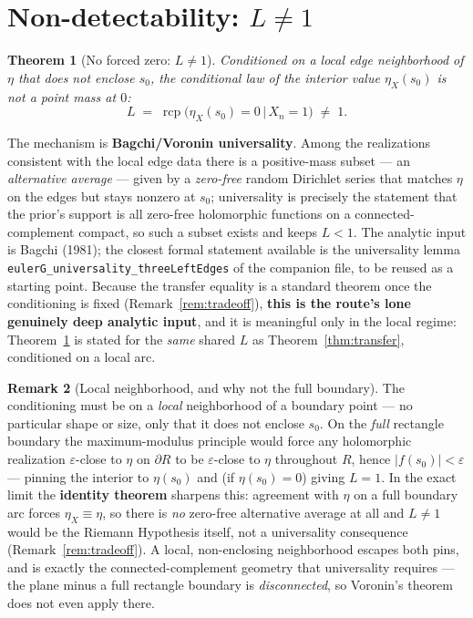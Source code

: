 \documentclass[11pt,a4paper]{article}
\newtheorem{theorem}{Theorem}[section]
\theoremstyle{definition}
\newtheorem{remark}[theorem]{Remark}
\newcommand{\etaX}{\eta_X}
\newcommand{\rcp}{\operatorname{rcp}}
\begin{document}
\section{Non-detectability: \texorpdfstring{$L\neq 1$}{L != 1}}\label{sec:nondetect}

\begin{theorem}[No forced zero: \(L\neq 1\)]\label{thm:nondetect}
Conditioned on a \emph{local} edge neighborhood of \(\eta\) that does not enclose \(s_0\),
the conditional law of the interior value \(\etaX(s_0)\) is not a point mass at \(0\):
\[
  L \;=\; \rcp\bigl(\etaX(s_0)=0 \,\big|\, X_n=1\bigr) \;\neq\; 1 .
\]
\end{theorem}
The mechanism is \textbf{Bagchi/Voronin universality}. Among the realizations consistent
with the local edge data there is a positive-mass subset --- an \emph{alternative
average} --- given by a \emph{zero-free} random Dirichlet series that matches \(\eta\) on
the edges but stays nonzero at \(s_0\); universality is precisely the statement that the
prior's support is all zero-free holomorphic functions on a connected-complement compact,
so such a subset exists and keeps \(L<1\). The analytic input is Bagchi (1981); the
closest formal statement available is the universality lemma
\texttt{eulerG\_universality\_threeLeftEdges} of the companion file, to be reused as a
starting point. Because the transfer equality is a standard theorem once the conditioning is
fixed (Remark~\ref{rem:tradeoff}), \textbf{this is the route's lone genuinely deep analytic
input}, and it is meaningful only in the local regime: Theorem~\ref{thm:nondetect} is stated for
the \emph{same} shared \(L\) as Theorem~\ref{thm:transfer}, conditioned on a local arc.

\begin{remark}[Local neighborhood, and why not the full boundary]\label{rem:maxmod}
The conditioning must be on a \emph{local} neighborhood of a boundary point --- no
particular shape or size, only that it does not enclose \(s_0\). On the \emph{full}
rectangle boundary the maximum-modulus principle would force any holomorphic realization
\(\varepsilon\)-close to \(\eta\) on \(\partial R\) to be \(\varepsilon\)-close to \(\eta\)
throughout \(R\), hence \(|f(s_0)|<\varepsilon\) --- pinning the interior to
\(\eta(s_0)\) and (if \(\eta(s_0)=0\)) giving \(L=1\). In the exact limit the
\textbf{identity theorem} sharpens this: agreement with \(\eta\) on a full boundary arc forces
\(\etaX\equiv\eta\), so there is \emph{no} zero-free alternative average at all and \(L\neq1\)
would be the Riemann Hypothesis itself, not a universality consequence (Remark~\ref{rem:tradeoff}).
A local, non-enclosing neighborhood escapes both pins, and is exactly the connected-complement
geometry that universality requires --- the plane minus a full rectangle boundary is
\emph{disconnected}, so Voronin's theorem does not even apply there.
\end{remark}
\end{document}
